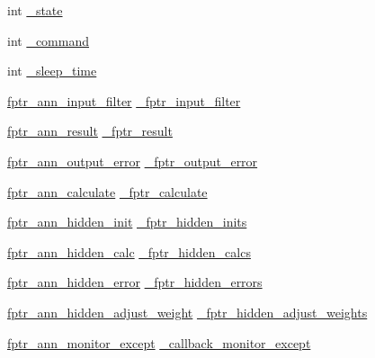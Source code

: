 \begin{DoxyCompactItemize}
int \hyperlink{classnanai_1_1nanai__ann__nanncalc_a1b2991833f76b5400e371f01ad7c6bbc}{\+\_\+state}
\item 
int \hyperlink{classnanai_1_1nanai__ann__nanncalc_a9834cef878366ef0bab79c5538a9f3be}{\+\_\+command}
\item 
int \hyperlink{classnanai_1_1nanai__ann__nanncalc_ad5c0182fd45d65dd7d91439d4eec6119}{\+\_\+sleep\+\_\+time}
\item 
\hyperlink{namespacenanai_a681d28f80aa95597ffc268b3b01abcfc}{fptr\+\_\+ann\+\_\+input\+\_\+filter} \hyperlink{classnanai_1_1nanai__ann__nanncalc_abebe28725dd1424ef5cd915f0146f56c}{\+\_\+fptr\+\_\+input\+\_\+filter}
\item 
\hyperlink{namespacenanai_ab737ac3c4f32f96a8ee6400db1c5a90f}{fptr\+\_\+ann\+\_\+result} \hyperlink{classnanai_1_1nanai__ann__nanncalc_afdaafe5d48d6590d9c38b020452eabce}{\+\_\+fptr\+\_\+result}
\item 
\hyperlink{namespacenanai_a5e697a4846a90e7e161e1d2d5be57688}{fptr\+\_\+ann\+\_\+output\+\_\+error} \hyperlink{classnanai_1_1nanai__ann__nanncalc_ac3d0e7fa0ac6210163391e0971f306cb}{\+\_\+fptr\+\_\+output\+\_\+error}
\item 
\hyperlink{namespacenanai_ac1a3ebd721fc3cfe1b9accfe7b65b7fe}{fptr\+\_\+ann\+\_\+calculate} \hyperlink{classnanai_1_1nanai__ann__nanncalc_afc0f3e68d5bc6d690d77f7ec938b2586}{\+\_\+fptr\+\_\+calculate}
\item 
\hyperlink{namespacenanai_a5fc4ff646e59919360af1ef410fe9671}{fptr\+\_\+ann\+\_\+hidden\+\_\+init} \hyperlink{classnanai_1_1nanai__ann__nanncalc_a8c430665e02d65d174eac790bb163341}{\+\_\+fptr\+\_\+hidden\+\_\+inits}
\item 
\hyperlink{namespacenanai_a299d9093f72831a48d205e94e200690c}{fptr\+\_\+ann\+\_\+hidden\+\_\+calc} \hyperlink{classnanai_1_1nanai__ann__nanncalc_a37c34eacc9c875653b79b4636596d4d3}{\+\_\+fptr\+\_\+hidden\+\_\+calcs}
\item 
\hyperlink{namespacenanai_aa8cd8d38cbd0a27e2818f132a3cfa2a2}{fptr\+\_\+ann\+\_\+hidden\+\_\+error} \hyperlink{classnanai_1_1nanai__ann__nanncalc_a6b4c7a5a93bd5d46f4ef78f5256963c7}{\+\_\+fptr\+\_\+hidden\+\_\+errors}
\item 
\hyperlink{namespacenanai_a1d9a4524c199b1a2891e208ce4b05306}{fptr\+\_\+ann\+\_\+hidden\+\_\+adjust\+\_\+weight} \hyperlink{classnanai_1_1nanai__ann__nanncalc_a90ca7f0507edefeb6c2b14641bbee7e9}{\+\_\+fptr\+\_\+hidden\+\_\+adjust\+\_\+weights}
\item 
\hyperlink{namespacenanai_ad9527fac6e647a6c149e4f9a8681e4c1}{fptr\+\_\+ann\+\_\+monitor\+\_\+except} \hyperlink{classnanai_1_1nanai__ann__nanncalc_a34ae5583c27674e94782b1491732139c}{\+\_\+callback\+\_\+monitor\+\_\+except}

\end{DoxyCompactItemize}
